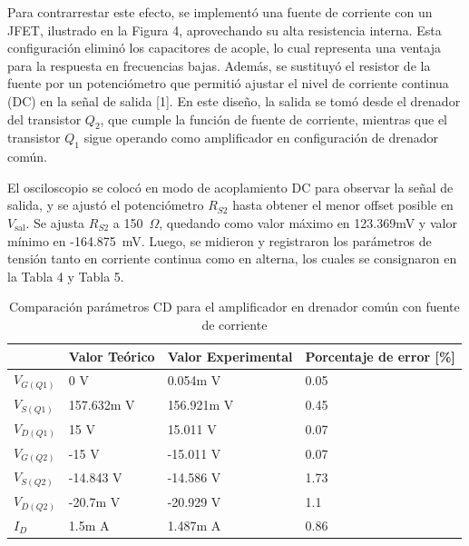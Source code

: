 \documentclass[journal]{IEEEtran}
\begin{document}
\par Para contrarrestar este efecto, se implementó una fuente de corriente con un JFET, ilustrado en la Figura 4, aprovechando su alta resistencia interna. Esta configuración eliminó los capacitores de acople, lo cual representa una ventaja para la respuesta en frecuencias bajas. Además, se sustituyó el resistor de la fuente por un potenciómetro que permitió ajustar el nivel de corriente continua (DC) en la señal de salida [1]. En este diseño, la salida se tomó desde el drenador del transistor $Q_2$, que cumple la función de fuente de corriente, mientras que el transistor $Q_1$ sigue operando como amplificador en configuración de drenador común.
\par El osciloscopio se colocó en modo de acoplamiento DC para observar la señal de salida, y se ajustó el potenciómetro $R_{S2}$ hasta obtener el menor offset posible en $V_{\text{sal}}$. Se ajusta $R_{S2}$ a 150~$\Omega$, quedando como valor máximo en 123.369mV y valor mínimo en -164.875~mV. Luego, se midieron y registraron los parámetros de tensión tanto en corriente continua como en alterna, los cuales se consignaron en la Tabla 4 y Tabla 5. 
\begin{table}[h]
    \caption{Comparación parámetros CD para el amplificador en drenador común con fuente de corriente}
    \centering
    \renewcommand{\arraystretch}{1.2} %
    \begin{tabular}{|l|p{2cm}|p{2cm}|p{2cm}|}
        \hline
        & \textbf{Valor Teórico} & \textbf{Valor Experimental} & \textbf{Porcentaje de error [\%]} \\
        \hline
        \( V_{G(Q1)} \) & 0 V  & 0.054m V  & 0.05 \\
        \hline
        \( V_{S(Q1)} \) & 157.632m V   & 156.921m V  & 0.45 \\
        \hline
        \( V_{D(Q1)} \) & 15 V & 15.011 V & 0.07 \\
        \hline
        \( V_{G(Q2)} \) & -15 V  & -15.011 V  & 0.07 \\
        \hline
        \( V_{S(Q2)} \) & -14.843 V   & -14.586 V  & 1.73 \\
        \hline
        \( V_{D(Q2)} \) & -20.7m V & -20.929 V & 1.1 \\
        \hline
        \( I_D \) & 1.5m A & 1.487m A & 0.86 \\
        \hline
    \end{tabular}
    \label{tab:resistencias}
\end{table}
\end{document}
